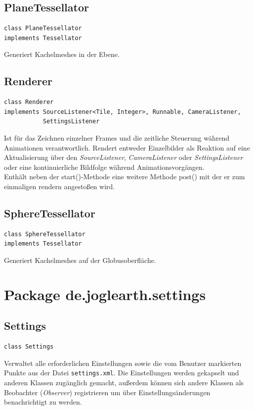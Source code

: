 \documentclass[10pt]{scrreprt}
\begin{document}
\vspace{5mm}
\subsection*{PlaneTessellator}
\begin{lstlisting}
class PlaneTessellator
implements Tessellator
\end{lstlisting}
Generiert Kachelmeshes in der Ebene.\\

\newpage
\vspace{5mm}
\subsection*{Renderer}
\begin{lstlisting}
class Renderer
implements SourceListener<Tile, Integer>, Runnable, CameraListener,
           SettingsListener
\end{lstlisting}
Ist für das Zeichnen einzelner Frames und die zeitliche Steuerung während Animationen verantwortlich. Rendert entweder Einzelbilder als Reaktion auf eine Aktualisierung über den \textit{SourceListener}, \textit{CameraListener} oder \textit{SettingsListener} oder eine kontinuierliche Bildfolge während Animationsvorgängen.\\
Enthält neben der start()-Methode eine weitere Methode post() mit der er zum einmaligen rendern angestoßen wird.\\
\vspace{5mm}
\subsection*{SphereTessellator}
\begin{lstlisting}
class SphereTessellator
implements Tessellator
\end{lstlisting}
Generiert Kachelmeshes auf der Globusoberfläche.\\




\vspace{5mm}
\section{Package de.joglearth.settings}
\subsection*{Settings}
\begin{lstlisting}
class Settings
\end{lstlisting}
Verwaltet alle erforderlichen Einstellungen sowie die vom Benutzer markierten Punkte aus der Datei \texttt{settings.xml}. Die Einstellungen werden gekapselt und anderen Klassen zugänglich gemacht, außerdem können sich andere Klassen als Beobachter (\textit{Observer}) registrieren um über Einstellungsänderungen benachrichtigt zu werden.\\
\end{document}
